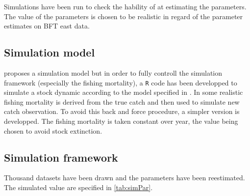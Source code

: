 Simulations have been run to check the hability of \iscam at estimating
the parameters. The value of the parameters is chosen to be realistic in regard of the parameter estimates on BFT east data.

\subsection{Simulation model}
\iscam proposes a simulation model but in order to fully controll the simulation framework (especially the fishing mortality), a \verb+R+ code has been developped to simulate a stock dynamic according to the model specified in \iscam.
In \iscam some realistic fishing mortality is derived from the true catch and then used to simulate new catch observation. To avoid this back and force procedure, a simpler version is developped. The fishing mortality is taken constant over year, the value being chosen to avoid stock extinction.
\subsection{Simulation framework}

Thousand datasets have been drawn and the parameters have been reestimated. The simulated value are specified in \ref{tab:simPar}.		

